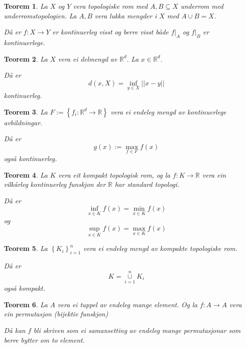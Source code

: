 \documentclass[a4paper, 12pt, norsk]{article}
\theoremstyle{plain}
\newtheorem{theorem}{Teorem}[section]
\theoremstyle{definition}
\newcommand{\Rb}{\mathbb{R}}
\newcommand{\union}{ \mathop{\cup}\limits }
\newcommand{\set}[1]{ \left\{ #1 \right\} } %
\begin{document}
\begin{theorem} \label{thm:pasting-lemma}
	La \( X \) og \( Y \) vera topologiske rom med \( A, B \subseteq X \) underrom med underromstopologien. La \( A, B \) vera lukka mengder i \( X \) med \( A \union B = X \). 
	
	Då er \( f: X \to Y \) er kontinuerleg visst og berre visst både \( f|_A \) og \( f|_B \) er kontinuerlege.
\end{theorem}

\begin{theorem} \label{thm:distanse-er-kont}
	La \( X \) vera ei delmengd av \( \Rb^d \). La \( x \in \Rb^d \). 
	
	Då er
	\[
		d(x, X) = \inf_{y \in X} ||x-y||
	\]
	kontinuerleg.
\end{theorem}

\begin{theorem} \label{thm:maksimum-av-kont-er-kont}
	La \( F := \set{f_i : \Rb^d \to \Rb} \) vera ei endeleg mengd av kontinuerlege avbildningar. 
	
	Då er
	\[
		g(x) := \max_{f \in F} f(x)
	\]
	også kontinuerleg.
\end{theorem}

\begin{theorem} \label{thm:infimum-over-kompakt-er-min} \label{thm:supremum-over-kompakt-er-maks}
	La \( K \) vera eit kompakt topologisk rom, og la \( f: K \to \Rb \) vera ein vilkårleg kontinuerleg funskjon der \( \Rb \) har standard topologi. 
	
	Då er
	\[
		\inf_{x \in K} f(x) = \min_{x \in K} f(x)
	\]
	og
	\[
		\sup_{x \in K} f(x) = \max_{x \in K} f(x)
	\]
\end{theorem}

\begin{theorem} \label{thm:endeleg-union-kompakt-er-kompakt}
	La \( \set{K_i}_{i = 1}^n \) vera ei endeleg mengd av kompakte topologiske rom. 
	
	Då er
	\[
		K = \union_{i=1}^n K_i
	\]
	også kompakt.
\end{theorem}

\begin{theorem} \label{thm:permutasjon}
	La \( A \) vera ei tuppel av endeleg mange element. Og la \( f: A \to A \) vera ein permutasjon (bijektiv funskjon)
	
	Då kan \( f \) bli skriven som ei samansetting av endeleg mange permutasjonar som berre bytter om to element.
\end{theorem}
\end{document}

